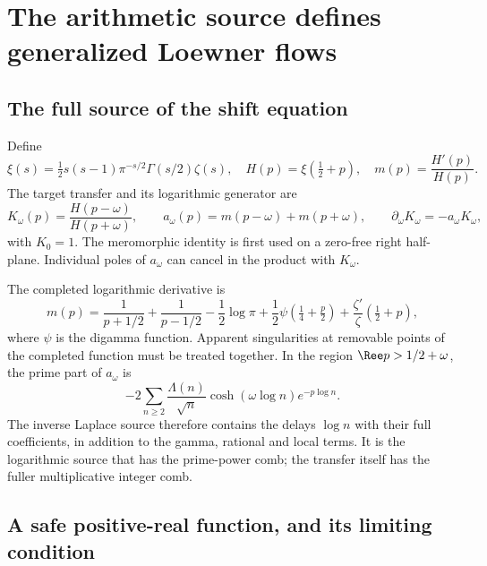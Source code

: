\section{The arithmetic source defines generalized Loewner flows}
\label{sec:arithmetic}

\subsection{The full source of the shift equation}

Define
\begin{equation}
 \xi(s)=\tfrac12s(s-1)\pi^{-s/2}\Gamma(s/2)\zeta(s),\quad
 H(p)=\xi(\tfrac12+p),\quad m(p)=\frac{H'(p)}{H(p)}.
\end{equation}
The target transfer and its logarithmic generator are
\begin{equation}
 K_\omega(p)=\frac{H(p-\omega)}{H(p+\omega)},\qquad
 a_\omega(p)=m(p-\omega)+m(p+\omega),
 \qquad \partial_\omega K_\omega=-a_\omega K_\omega,
 \label{eq:arithmetic_shift}
\end{equation}
with $K_0=1$. The meromorphic identity is first used on a zero-free
right half-plane. Individual poles of $a_\omega$ can cancel in the
product with $K_\omega$.

The completed logarithmic derivative is
\begin{equation}
 m(p)=\frac1{p+1/2}+\frac1{p-1/2}-\frac12\log\pi
 +\frac12\psi\left(\tfrac14+\tfrac p2\right)
 +\frac{\zeta'}{\zeta}\left(\tfrac12+p\right),
 \label{eq:completed_source}
\end{equation}
where $\psi$ is the digamma function. Apparent singularities at removable
points of the completed function must be treated together. In the region
$\Ree p>1/2+\omega$, the prime part of $a_\omega$ is
\begin{equation}
 -2\sum_{n\ge2}\frac{\Lambda(n)}{\sqrt n}
       \cosh(\omega\log n)e^{-p\log n}.
 \label{eq:prime_source}
\end{equation}
The inverse Laplace source therefore contains the delays $\log n$ with
their full coefficients, in addition to the gamma, rational and local
terms. It is the logarithmic source that has the prime-power comb; the
transfer itself has the fuller multiplicative integer comb.

\subsection{A safe positive-real function, and its limiting condition}


